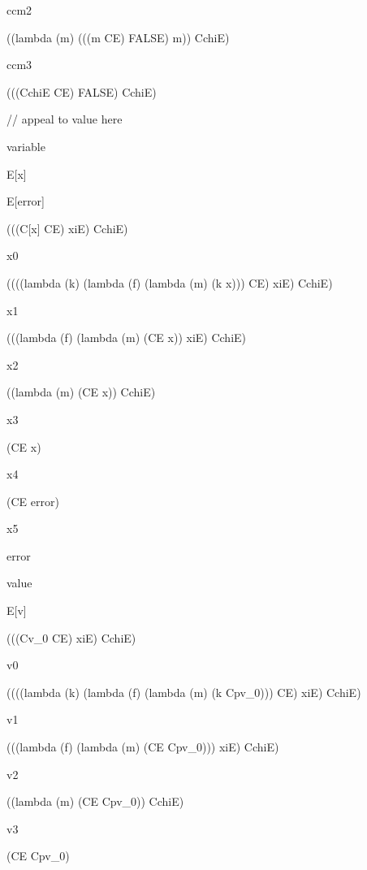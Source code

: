 \begin{singlespace}
ccm2
\begin{schemedisplay}
((lambda (m)
   (((m CE) FALSE) m))
 CchiE)
\end{schemedisplay}

ccm3
\begin{schemedisplay}
(((CchiE CE) FALSE) CchiE)
\end{schemedisplay}

// appeal to value here

variable
\begin{schemedisplay}
E[x]
\end{schemedisplay}

\begin{schemedisplay}
E[error]
\end{schemedisplay}

\begin{schemedisplay}
(((C[x] CE) xiE) CchiE)
\end{schemedisplay}

x0
\begin{schemedisplay}
((((lambda (k) (lambda (f) (lambda (m) (k x))) CE) xiE) CchiE)
\end{schemedisplay}

x1
\begin{schemedisplay}
(((lambda (f) (lambda (m) (CE x)) xiE) CchiE)
\end{schemedisplay}

x2
\begin{schemedisplay}
((lambda (m) (CE x)) CchiE)
\end{schemedisplay}

x3
\begin{schemedisplay}
(CE x)
\end{schemedisplay}

x4
\begin{schemedisplay}
(CE error)
\end{schemedisplay}

x5
\begin{schemedisplay}
error
\end{schemedisplay}

value
\begin{schemedisplay}
E[v]
\end{schemedisplay}

\begin{schemedisplay}
(((Cv_0 CE) xiE) CchiE)
\end{schemedisplay}

v0
\begin{schemedisplay}
((((lambda (k) (lambda (f) (lambda (m) (k Cpv_0))) CE) xiE) CchiE)
\end{schemedisplay}

v1
\begin{schemedisplay}
(((lambda (f) (lambda (m) (CE Cpv_0))) xiE) CchiE)
\end{schemedisplay}

v2
\begin{schemedisplay}
((lambda (m) (CE Cpv_0)) CchiE)
\end{schemedisplay}

v3
\begin{schemedisplay}
(CE Cpv_0)
\end{schemedisplay}
\end{singlespace}

